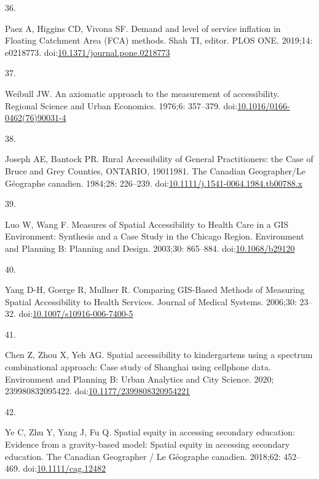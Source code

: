 \documentclass[10pt,letterpaper]{article}
\newlength{\cslhangindent}
\newlength{\csllabelwidth}
\newlength{\cslentryspacingunit} %
\newenvironment{CSLReferences}[2] %
 {%
  \setlength{\parindent}{0pt}
  \ifodd #1
  \let\oldpar\par
  \def\par{\hangindent=\cslhangindent\oldpar}
  \fi
  \setlength{\parskip}{#2\cslentryspacingunit}
 }%
 {}
\newcommand{\CSLLeftMargin}[1]{\parbox[t]{\csllabelwidth}{#1}}
\newcommand{\CSLRightInline}[1]{\parbox[t]{\linewidth - \csllabelwidth}{#1}\break}
\begin{document}
\begin{CSLReferences}{0}{0}
\leavevmode{}%
\CSLLeftMargin{36. }%
\CSLRightInline{Paez A, Higgins CD, Vivona SF. Demand and level of
service inflation in Floating Catchment Area (FCA) methods. Shah TI,
editor. PLOS ONE. 2019;14: e0218773.
doi:\href{https://doi.org/10.1371/journal.pone.0218773}{10.1371/journal.pone.0218773}}

\leavevmode{}%
\CSLLeftMargin{37. }%
\CSLRightInline{Weibull JW. An axiomatic approach to the measurement of
accessibility. Regional Science and Urban Economics. 1976;6: 357--379.
doi:\href{https://doi.org/10.1016/0166-0462(76)90031-4}{10.1016/0166-0462(76)90031-4}}

\leavevmode{}%
\CSLLeftMargin{38. }%
\CSLRightInline{Joseph AE, Bantock PR. Rural Accessibility of General
Practitioners: the Case of Bruce and Grey Counties, ONTARIO,
1901{\textendash}1981. The Canadian Geographer/Le Géographe canadien.
1984;28: 226--239.
doi:\href{https://doi.org/10.1111/j.1541-0064.1984.tb00788.x}{10.1111/j.1541-0064.1984.tb00788.x}}

\leavevmode{}%
\CSLLeftMargin{39. }%
\CSLRightInline{Luo W, Wang F. Measures of Spatial Accessibility to
Health Care in a GIS Environment: Synthesis and a Case Study in the
Chicago Region. Environment and Planning B: Planning and Design.
2003;30: 865--884.
doi:\href{https://doi.org/10.1068/b29120}{10.1068/b29120}}

\leavevmode{}%
\CSLLeftMargin{40. }%
\CSLRightInline{Yang D-H, Goerge R, Mullner R. Comparing {GIS}-{Based}
{Methods} of {Measuring} {Spatial} {Accessibility} to {Health}
{Services}. Journal of Medical Systems. 2006;30: 23--32.
doi:\href{https://doi.org/10.1007/s10916-006-7400-5}{10.1007/s10916-006-7400-5}}

\leavevmode{}%
\CSLLeftMargin{41. }%
\CSLRightInline{Chen Z, Zhou X, Yeh AG. Spatial accessibility to
kindergartens using a spectrum combinational approach: {Case} study of
{Shanghai} using cellphone data. Environment and Planning B: Urban
Analytics and City Science. 2020; 239980832095422.
doi:\href{https://doi.org/10.1177/2399808320954221}{10.1177/2399808320954221}}

\leavevmode{}%
\CSLLeftMargin{42. }%
\CSLRightInline{Ye C, Zhu Y, Yang J, Fu Q. Spatial equity in accessing
secondary education: {Evidence} from a gravity-based model: {Spatial}
equity in accessing secondary education. The Canadian Geographer / Le
Géographe canadien. 2018;62: 452--469.
doi:\href{https://doi.org/10.1111/cag.12482}{10.1111/cag.12482}}


\end{CSLReferences}
\end{document}
